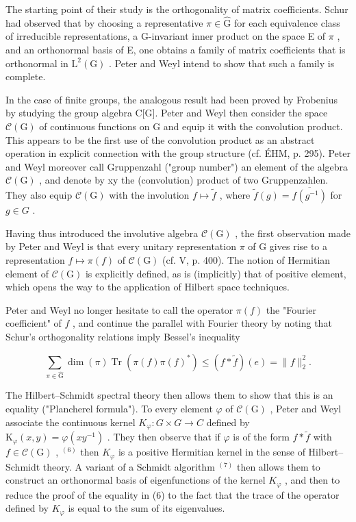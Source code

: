 The starting point of their study is the orthogonality of matrix coefficients. Schur had observed that by choosing a representative \(\pi \in \widehat{\mathrm{G}}\) for each equivalence class of irreducible representations, a G-invariant inner product on the space E of \(\pi\) , and an orthonormal basis of E, one obtains a family of matrix coefficients that is orthonormal in \(\mathrm{L}^2 (\mathrm{G})\) . Peter and Weyl intend to show that such a family is complete.

In the case of finite groups, the analogous result had been proved by Frobenius by studying the group algebra C{[}G{]}. Peter and Weyl then consider the space \(\mathcal{C}(\mathrm{G})\) of continuous functions on G and equip it with the convolution product. This appears to be the first use of the convolution product as an abstract operation in explicit connection with the group structure (cf. ÉHM, p. 295). Peter and Weyl moreover call Gruppenzahl ("group number") an element of the algebra \(\mathcal{C}(\mathrm{G})\) , and denote by xy the (convolution) product of two Gruppenzahlen. They also equip \(\mathcal{C}(\mathrm{G})\) with the involution \(f \mapsto \widetilde{f}\) , where \(\widetilde{f}(g) = \overline{f(g^{-1})}\) for \(g \in G\) .

Having thus introduced the involutive algebra \(\mathcal{C}(\mathrm{G})\) , the first observation made by Peter and Weyl is that every unitary representation \(\pi\) of G gives rise to a representation \(f \mapsto \pi(f)\) of \(\mathcal{C}(\mathrm{G})\) (cf. V, p. 400). The notion of Hermitian element of \(\mathcal{C}(\mathrm{G})\) is explicitly defined, as is (implicitly) that of positive element, which opens the way to the application of Hilbert space techniques.

Peter and Weyl no longer hesitate to call the operator \(\pi(f)\) the "Fourier coefficient" of \(f\) , and continue the parallel with Fourier theory by noting that Schur's orthogonality relations imply Bessel's inequality

\[
\sum_ {\pi \in \widehat {\mathrm{G}}} \dim (\pi) \operatorname{Tr} (\pi (f) \pi (f) ^ {*}) \leqslant (f * \widetilde {f}) (e) = \| f \| _ {2} ^ {2}.\tag{6}
\]

The Hilbert--Schmidt spectral theory then allows them to show that this is an equality ("Plancherel formula"). To every element \(\varphi\) of \(\mathcal{C}(\mathrm{G})\) , Peter and Weyl associate the continuous kernel \(K_{\varphi}\colon G\times G\to C\) defined by \(\mathrm{K}_{\varphi}(x,y)=\varphi(xy^{-1})\) . They then observe that if \(\varphi\) is of the form \(f*\widetilde{f}\) with \(f\in\mathcal{C}(\mathrm{G})\) , \(^{(6)}\) then \(K_{\varphi}\) is a positive Hermitian kernel in the sense of Hilbert--Schmidt theory. A variant of a Schmidt algorithm \(^{(7)}\) then allows them to construct an orthonormal basis of eigenfunctions of the kernel \(K_{\varphi}\) , and then to reduce the proof of the equality in (6) to the fact that the trace of the operator defined by \(K_{\varphi}\) is equal to the sum of its eigenvalues.

